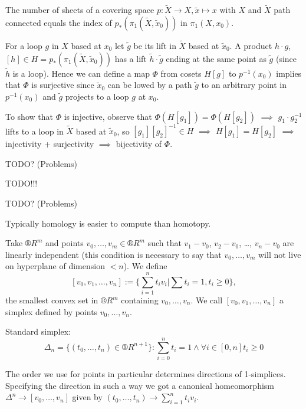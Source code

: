 \documentclass[12pt]{article}					%
\begin{document}
\begin{tvrzeni}
	The number of sheets of a covering space $p: \tilde X \rightarrow X, \tilde x \mapsto x$ with $X$ and $\tilde X$ path connected equals the index of $p_*(π_1(\tilde X, \tilde x_0))$ in $π_1(X, x_0)$.

	\begin{dukazin}
		For a loop $g$ in $X$ based at $x_0$ let $\tilde g$ be its lift in $\tilde X$ based at $\tilde x_0$. A product $h·g$, $[h] \in H = p_*(π_1(\tilde X, \tilde x_0))$ has a lift $\tilde h·\tilde g$ ending at the same point as $\tilde g$ (since $\tilde h$ is a loop). Hence we can define a map $Φ$ from cosets $H[g]$ to $p^{-1}(x_0)$ implies that $Φ$ is surjective since $\tilde x_0$ can be lowed by a path $\tilde g$ to an arbitrary point in $p^{-1}(x_0)$ and $\tilde g$ projects to a loop $g$ at $x_0$.

		To show that $Φ$ is injective, observe that $Φ(H[g_1]) = Φ(H[g_2])$ $\implies$ $g_1·g_2^{-1}$ lifts to a loop in $\tilde X$ based at $\tilde x_0$, so $[g_1][g_2]^{-1} \in H$ $\implies$ $H[g_1] = H[g_2]$ $\implies$ injectivity + surjectivity $\implies$ bijectivity of $Φ$.
	\end{dukazin}
\end{tvrzeni}


TODO? (Problems)


TODO!!!


TODO? (Problems)


\begin{poznamka}
	Typically homology is easier to compute than homotopy.
\end{poznamka}

\begin{definice}
	Take $®R^m$ and points $v_0, …, v_m \in ®R^m$ such that $v_1 - v_0$, $v_2 - v_0$, …, $v_n - v_0$ are linearly independent (this condition is necessary to say that $v_0, …, v_m$ will not live on hyperplane of dimension $< n$). We define
	$$ [v_0, v_1, …, v_n] := \{\sum_{i=1}^n t_i v_i | \sum t_i = 1, t_i ≥ 0\}, $$
	the smallest convex set in $®R^m$ containing $v_0, …, v_n$. We call $[v_0, v_1, …, v_n]$ a simplex defined by points $v_0, …, v_n$.

	Standard simplex:
	$$ Δ_n = \{(t_0, …, t_n) \in ®R^{n+1}\}: \sum_{i=0}^n t_i = 1 \land \forall i \in [0, n] t_i ≥ 0 $$

	The order we use for points in particular determines directions of 1-simplices. Specifying the direction in such a way we got a canonical homeomorphism $Δ^n \rightarrow [v_0, …, v_n]$ given by $(t_0, …, t_n) \rightarrow \sum_{i=1}^n t_i v_i$.
\end{definice}
\end{document}
